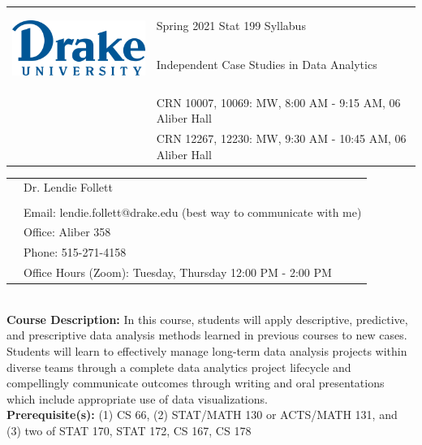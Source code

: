 \documentclass[11pt]{article}\usepackage[]{graphicx}\usepackage[]{color}
\begin{document}


\begin{tabular}{ l l }
  \multirow{3}{*}{\includegraphics[height=1in,width=2.2in]{DU_PRIMARY_294C_NEW.png}} &  \Large Spring 2021 Stat 199 Syllabus \\
  &  \Large Independent Case Studies in Data Analytics \\\\
  & CRN 10007, 10069: MW, 8:00 AM - 9:15 AM, 06 Aliber Hall \\
    & CRN 12267, 12230: MW, 9:30 AM - 10:45 AM, 06 Aliber Hall \\
\end{tabular}
\vspace{10mm}

\begin{tabular}{ l l }
  \multirow{6}{*}{} & \large Dr. Lendie Follett \\\\
  & \large Email: lendie.follett@drake.edu (best way to communicate with me) \\
  & \large Office: Aliber 358 \\
      & \large Phone: 515-271-4158\\
  & \large Office Hours (Zoom): Tuesday, Thursday 12:00 PM - 2:00 PM \\ 
\end{tabular}
\vspace{.5cm}


\textbf {\large \\ Course Description:} In this course, students will apply descriptive, predictive, and prescriptive data analysis methods learned in previous courses to new cases. Students will learn to effectively manage long-term data analysis projects within diverse teams through a complete data analytics project lifecycle and compellingly communicate outcomes through writing and oral presentations which include appropriate use of data visualizations.\\
\textbf {Prerequisite(s):} (1) CS 66, (2) STAT/MATH 130 or ACTS/MATH 131, and (3) two of STAT 170, STAT 172, CS 167, CS 178
\end{document}
